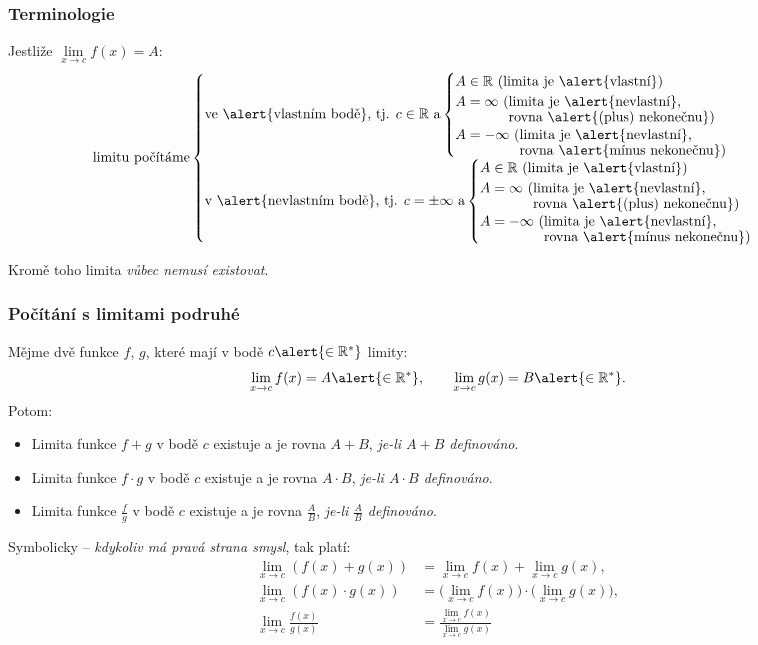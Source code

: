 \documentclass[handout]%
{beamer}
\newcommand{\R}{\mathbb R}
\begin{document}
\begin{frame}
	\frametitle{Terminologie}
	Jestliže $\lim\limits_{x\to c}f(x) = A$:\pause
	{\scriptsize
	\[ \text{limitu počítáme}
	\begin{cases}
	\text{ve \alert{vlastním bodě}, tj. }c \in \R\text{ a} 
		\begin{cases}
			A \in \R \text{ (limita je \alert{vlastní})}\\
			A = \infty\ \vtop{\hbox{\strut(limita je \alert{nevlastní},}\hbox{\phantom(rovna \alert{(plus) nekonečnu})}}\\
			A = -\infty\ \vtop{\hbox{\strut(limita je \alert{nevlastní},}\hbox{\phantom(rovna \alert{mínus nekonečnu})}}
		\end{cases} \\
	\text{v \alert{nevlastním bodě}, tj. }c = \pm\infty\text{ a}
		\begin{cases}
			A \in \R \text{ (limita je \alert{vlastní})}\\
			A = \infty\ \vtop{\hbox{\strut(limita je \alert{nevlastní},}\hbox{\phantom(rovna \alert{(plus) nekonečnu})}}\\
			A = -\infty\ \vtop{\hbox{\strut(limita je \alert{nevlastní},}\hbox{\phantom(rovna \alert{mínus nekonečnu})}}
		\end{cases}
	\end{cases}
	\]}
	
	\pause\bigskip\bigskip
	Kromě toho limita \emph{vůbec nemusí existovat}.
\end{frame}


\begin{frame}
	\frametitle{Počítání s limitami podruhé}\pause
	Mějme dvě funkce $f$, $g$, které mají v bodě $c \alert{\in \R^*}$ limity:
	\[ \lim_{x\to c}f(x) = A\alert{\in \R^*}, \qquad \lim_{x\to c}g(x) = B\alert{\in \R^*}. \]
	Potom:\pause
	\begin{itemize}
		\item Limita funkce $f + g$ v bodě $c$ existuje a je rovna $A + B$, \pause \emph{je-li $A + B$ definováno}.\pause
		\item Limita funkce $f \cdot g$ v bodě $c$ existuje a je rovna $A \cdot B$, \pause \emph{je-li $A\cdot B$ definováno}.\pause
		\item Limita funkce $\frac fg$ v bodě $c$ existuje a je rovna $\frac AB$, \pause \emph{je-li $\frac AB$ definováno}.%
	\end{itemize}
	\pause
	Symbolicky -- \emph{kdykoliv má pravá strana smysl}, tak platí:\pause
	\begin{align*}
	\lim_{x \to c}(f(x) + g(x)) &= \lim_{x \to c}f(x) + \lim_{x \to c}g(x),\\
	\lim_{x \to c}(f(x) \cdot g(x)) &= \bigl(\lim_{x \to c}f(x)\bigr) \cdot \bigl(\lim_{x \to c}g(x)\bigr),\\
	\lim_{x \to c}\frac{f(x)}{g(x)} &= \frac{\lim\limits_{x \to c}f(x)}{\lim\limits_{x \to c}g(x)}
	\end{align*}%
	
\end{frame}
\end{document}
